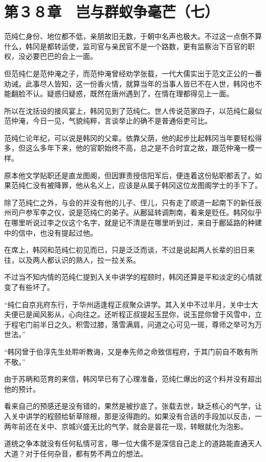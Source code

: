 \section{第３８章　岂与群蚁争毫芒（七）}

范纯仁身份、地位都不低，亲朋故旧无数，于朝中名声也极大。不过这一点倒不算什么，韩冈是都转运使，监司官与亲民官不是一个路数，更有监察治下百官的职权，没必要巴巴的会上一面。

但范纯仁是范仲淹之子，而范仲淹曾经劝学张载，一代大儒实出于范文正公的一番劝诫。此事尽人皆知，这一份香火情，就算当年的当事人皆已不在人世，韩冈也不能翻脸不认。疑惑归疑惑，既然在唐州遇到了，在情在理都得见上一面。

所以在沈括设的接风宴上，韩冈见到了范纯仁。世人传说范家四子，以范纯仁最似范仲淹，今日一见，气貌纯粹，言谈举止的确不是普通俗吏可比。

范纯仁论年纪，可以说是韩冈的父辈。依靠父荫，他的起步比起韩冈当年要轻松得多，但这么多年下来，他的官职始终不高，总之是不合时宜之故，跟范仲淹一模一样。

原本他文学贴职还是直龙图阁，但因罪责授信阳军后，便连着这份贴职都丢了。如果范纯仁没有被降罪，他从名义上，应该是从属于韩冈这位龙图阁学士的手下了。

除了范纯仁之外，与会的并没有他的儿子、侄儿，只有走了顺道一起南下的新任辰州司户参军李之仪，说是范纯仁的弟子。从鄜延转调荆南，看来是贬任。韩冈似乎在哪里听说过李之仪这个名字，就是记不清是在哪里听到过，来自于鄜延路的种建中的信中，也没有提起过他。

在席上，韩冈和范纯仁初见而已，只是泛泛而谈，不过是说起两人长辈的旧日来往，以及两人都认识的熟人，拉一拉关系。

不过当不知内情的范纯仁提到入关中讲学的程颐时，韩冈还算是平和淡定的心情就变了有些坏了。

“纯仁自京兆府东行，于华州适逢程正叔聚众讲学。其入关中不过半月，关中士大夫便已是闻风影从，心向往之。还听程正叔提起玉昆你，说玉昆你曾于风雪中，立于程宅门前半日之久。积雪过膝，落雪满肩，问道之心可见一斑，尊师之举可为万世法。”

“韩冈曾于伯淳先生处聆听教诲，又是奉先师之命致信程府，于其门前自不敢有所不敬。”

由于苏昞和范育的来信，韩冈早已有了心理准备，范纯仁爆出的这个料并没有超出他的预计。

看来自己的预感还是没有错的，果然是被抄底了。张载去世，缺乏核心的气学，让入关中讲学的程颐给斩草除根，那是没得跑的。如果没有合适的手段加以反击，一两年前还在关中、京城兴盛无比的气学，就会是昙花一现，转眼就化为泡影。

道统之争本就没有任何私情可言，哪一位大儒不是深信自己走上的道路能直通天人大道？对于任何杂音，都有势不两立的想法。

